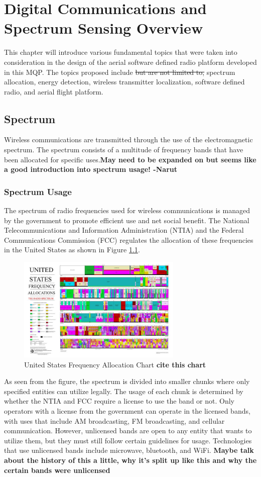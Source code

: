 \chapter{Digital Communications and Spectrum Sensing Overview}
This chapter will introduce various fundamental topics that were taken into consideration in the design of the aerial software defined radio platform developed in this MQP. The topics proposed include \sout{but are not limited to,} spectrum allocation, energy detection, wireless transmitter localization, software defined radio, and aerial flight platform.

\section{Spectrum}
Wireless communications are transmitted through the use of the electromagnetic spectrum. The spectrum consists of a multitude of frequency bands that have been allocated for specific uses.\textbf{May need to be expanded on but seems like a good introduction into spectrum usage! -Narut}
\subsection{Spectrum Usage}
The spectrum of radio frequencies used for wireless communications is managed by the government to promote efficient use and net social benefit. The National Telecommunications and Information Administration (NTIA) and the Federal Communications Commission (FCC) regulates the allocation of these frequencies in the United States as shown in Figure \ref{fig:freq_chart}\cite{FCC_Info}. 
\begin{figure}[ht]
\centering
\includegraphics[width=0.70\textwidth]{img/the_radio_spectrum.jpg}
\caption{United States Frequency Allocation Chart \textbf{cite this chart}}
\label{fig:freq_chart}
\end{figure}
As seen from the figure, the spectrum is divided into smaller chunks where only specified entities can utilize legally. The usage of each chunk is determined by whether the NTIA and FCC require a license to use the band or not. Only operators with a license from the government can operate in the licensed bands, with uses that include AM broadcasting, FM broadcasting, and cellular communication. However, unlicensed bands are open to any entity that wants to utilize them, but they must still follow certain guidelines for usage. Technologies that use unlicensed bands include microwave, bluetooth, and WiFi. \textbf{Maybe talk about the history of this a little, why it's split up like this and why the certain bands were unlicensed}

